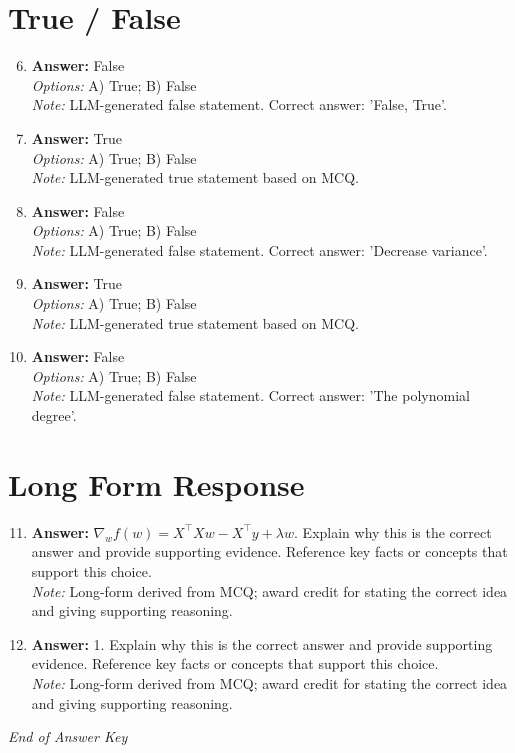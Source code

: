 \documentclass[12pt]{article}
\begin{document}
\section*{True / False}
\begin{enumerate}[label=\arabic*.]
\setcounter{enumi}{5}
\item \textbf{Answer:} False
\\ \textit{Options:} A) True; B) False
\\ \textit{Note:} LLM-generated false statement. Correct answer: 'False, True'.
\item \textbf{Answer:} True
\\ \textit{Options:} A) True; B) False
\\ \textit{Note:} LLM-generated true statement based on MCQ.
\item \textbf{Answer:} False
\\ \textit{Options:} A) True; B) False
\\ \textit{Note:} LLM-generated false statement. Correct answer: 'Decrease variance'.
\item \textbf{Answer:} True
\\ \textit{Options:} A) True; B) False
\\ \textit{Note:} LLM-generated true statement based on MCQ.
\item \textbf{Answer:} False
\\ \textit{Options:} A) True; B) False
\\ \textit{Note:} LLM-generated false statement. Correct answer: 'The polynomial degree'.
\end{enumerate}

\section*{Long Form Response}
\begin{enumerate}[label=\arabic*.]
\setcounter{enumi}{10}
\item \textbf{Answer:} $\nabla_w f(w) = X^\top X w - X^\top y + \lambda w$. Explain why this is the correct answer and provide supporting evidence. Reference key facts or concepts that support this choice.
\\ \textit{Note:} Long-form derived from MCQ; award credit for stating the correct idea and giving supporting reasoning.
\item \textbf{Answer:} 1. Explain why this is the correct answer and provide supporting evidence. Reference key facts or concepts that support this choice.
\\ \textit{Note:} Long-form derived from MCQ; award credit for stating the correct idea and giving supporting reasoning.
\end{enumerate}

\vfill
\noindent\textit{End of Answer Key}
\end{document}
